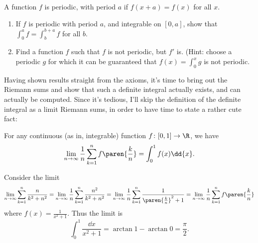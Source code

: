\documentclass{ccg-topic}
\begin{document}
\begin{todo}
    \label{todo:definite_integrals_of_periodic_functions}
    A function $f$ is \textrm{periodic}, with \textrm{period} $a$ if $f(x + a) = f(x)$ for all $x$.
    \begin{enumerate}
        \item If $f$ is periodic with period $a$, and integrable on $[0,a]$, show that $\int_0^a f = \int_b^{b+a} f$ for all $b$.
        \item Find a function $f$ such that $f$ is not periodic, but $f'$ is. (Hint: choose a periodic $g$ for which it can be guaranteed that $f(x) = \int_0^x g$ is not periodic.
    \end{enumerate}
\end{todo}

Having shown results straight from the axioms, it's time to bring out the Riemann sums and show that such a definite integral actually exists, and can actually be computed. Since it's tedious, I'll skip the definition of the definite integral as a limit Riemann sums, in order to have time to state a rather cute fact:

\begin{fact}
    \label{fact:}
    For any continuous (as in, integrable) function $f \colon [0,1] \to \R$, we have 
    \[
        \lim_{n \to \infty} \frac{1}{n} \sum\limits_{k=1}^{n} f\paren{ \frac{k}{n} } = \int_0^1 f(x) \dd{x}.
    \]
\end{fact}

\begin{ex}
    \label{ex:arctangent_as_a_sum}
    Consider the limit 
    \begin{equation*}
        \lim_{n \to \infty} \sum\limits_{k=1}^{n} \frac{n}{k^2 + n^2} = \lim_{n \to \infty} \frac{1}{n} \sum\limits_{k=1}^{n} \frac{n^2}{k^2 + n^2} = \lim_{n \to \infty} \frac{1}{n} \sum\limits_{k=1}^{n} \frac{1}{\paren{\frac{k}{n}}^2 + 1} = \lim_{n \to \infty} \frac{1}{n}\sum\limits_{k=1}^{n} f \paren{\frac{k}{n}}
    \end{equation*}
    where $f(x) = \frac{1}{x^2 + 1} $. Thus the limit is
    \begin{equation*}
        \int_0^1 \frac{\dd{x}}{x^2 + 1} = \arctan 1 - \arctan 0 = \frac{\pi}{2}.
    \end{equation*}
\end{ex}
\end{document}
